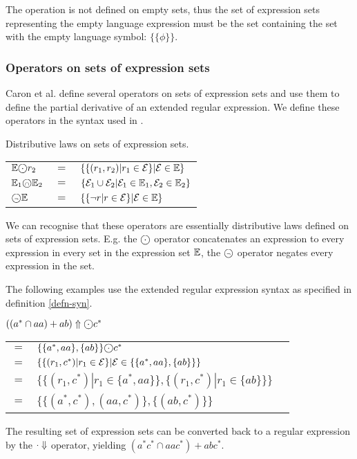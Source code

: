 The operation is not defined on empty sets, thus the set of expression sets
representing the empty language expression must be the set containing the set
with the empty language symbol: $\{\{\phi\}\}$.

\subsubsection{Operators on sets of expression sets}

Caron et al. define several operators on sets of expression sets and use them to
define the partial derivative of an extended regular expression\cite{pdere}. We
define these operators in the syntax used in \cite{pdpat}.

\begin{defn}
   \label{defn-eset-ops}
   Distributive laws on sets of expression sets.

   \begin{tabular}{lll}
      $\esets \circledcdot r_2$
         & $=$
         & $\{ \{ (r_1, r_2) | r_1 \in \mathcal{E} \} | \mathcal{E} \in \mathbb{E} \}$
         \\

      $\mathbb{E}_1 \text{\textcircled{\tiny$\cap$}} \mathbb{E}_2$
         & $=$
         & $\{
              \mathcal{E}_1 \cup \mathcal{E}_2
              | \mathcal{E}_1 \in \mathbb{E}_1, \mathcal{E}_2 \in \mathbb{E}_2
           \}$
         \\

      $\text{\textcircled{\tiny$\neg$}}\mathbb{E}$
         & $=$
         & $\{ \{ \neg r | r \in \mathcal{E} \} | \mathcal{E} \in \mathbb{E} \}$
         \\
   \end{tabular}
\end{defn}

We can recognise that these operators are essentially distributive laws defined
on sets of expression sets. E.g. the $\circledcdot$ operator concatenates an
expression to every expression in every set in the expression set $\mathbb{E}$, the
$\text{\textcircled{\tiny$\neg$}}$ operator negates every expression in the set.

The following examples use the extended regular expression syntax as specified
in definition \ref{defn-syn}.

\begin{eg}
   $((a^* \cap aa) + ab)\esetsOfRe \circledcdot c^*$

   \begin{tabular}{lll}
      $=$ &
         $\{\{a^*, aa\}, \{ab\}\} \circledcdot c^*$
      \\ $=$ &
         $\{ \{ (r_1, c^*) | r_1 \in \mathcal{E} \} | \mathcal{E} \in \{\{a^*, aa\}, \{ab\}\} \}$
      \\ $=$ &
         $\{ \{ (r_1, c^*) | r_1 \in \{a^*, aa\} \}, \{ (r_1, c^*) | r_1 \in \{ab\} \} \}$
      \\ $=$ &
         $\{ \{ (a^*, c^*), (aa, c^*) \}, \{ (ab, c^*) \} \}$
   \end{tabular}

   The resulting set of expression sets can be converted back to a regular
   expression by the $\cdot\Downarrow$ operator, yielding $(a^*c^* \cap aac^*) +
   abc^*$.
\end{eg}

